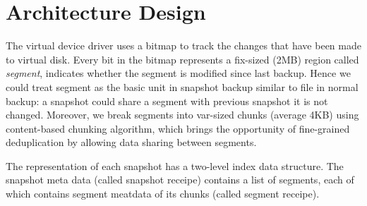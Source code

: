 \section{Architecture Design}



The virtual device driver uses a bitmap to track the changes that have been made to virtual disk.
Every bit in the bitmap represents a fix-sized (2MB) region called \textit{segment}, indicates whether the segment
is modified since last backup. Hence we could treat segment as the basic unit in snapshot backup similar to
file in normal backup: a snapshot could share a segment with previous snapshot it is not changed. 
Moreover, we break segments into var-sized chunks (average 4KB) using content-based chunking algorithm,
which brings the opportunity of fine-grained deduplication by
allowing data sharing between segments.

The representation of each snapshot has  a two-level index data structure. 
The snapshot meta data (called snapshot receipe) contains a list of segments, each of which contains segment 
meatdata of its chunks (called segment receipe). 


